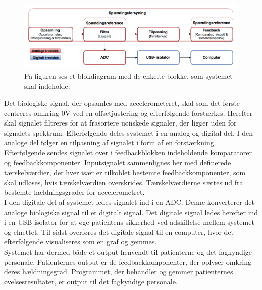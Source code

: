 \begin{figure}[H]
	\centering
	\includegraphics[scale=0.73]{figures/cProblemloesning/blokdiagram.PNG}
	\caption{På figuren ses et blokdiagram med de enkelte blokke, som systemet skal indeholde.}
	\label{kravblok}
\end{figure}
\noindent Det biologiske signal, der opsamles med accelerometeret, skal som det første centreres omkring $0$V ved en offsetjustering og efterfølgende forstærkes. Herefter skal signalet filtreres for at frasortere uønskede signaler, der ligger uden for signalets spektrum. Efterfølgende deles systemet i en analog og digital del. I den analoge del følger en tilpasning af signalet i form af en forstærkning. Efterfølgende sendes signalet over i feedbackblokken indeholdende komparatorer og feedbackkomponenter. Inputsignalet sammenlignes her med definerede tærskelværdier, der hver især er tilkoblet bestemte feedbackkomponenter, som skal udløses, hvis tærskelværdien overskrides. Tærskelværdierne sættes ud fra bestemte hældningsgrader for accelerometret. \\
I den digitale del af systemet ledes signalet ind i en ADC. Denne konverterer det analoge biologiske signal til et digitalt signal. Det digitale signal ledes herefter ind i en USB-isolator for at øge patientens sikkerhed ved adskillelse mellem systemet og elnettet. Til sidst overføres det digitale signal til en computer, hvor det efterfølgende visualiseres som en graf og gemmes. \\
Systemet har dermed både et output henvendt til patienterne og det fagkyndige personale. Patienternes output er de feedbackkomponenter, der oplyser omkring deres hældningsgrad. Programmet, der behandler og gemmer patienternes øvelsesresultater, er output til det fagkyndige personale.

